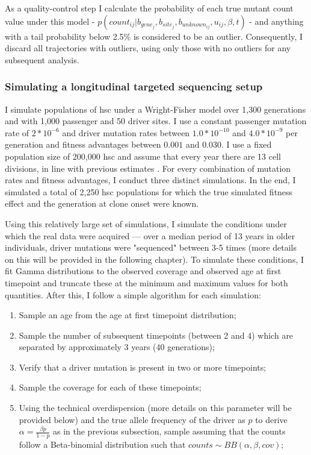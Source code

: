 As a quality-control step I calculate the probability of each true mutant count value under this model - $p(count_{ij}|b_{gene_j},b_{site_j},b_{unknown_{ij}},u_{ij},\beta,t)$ - and anything with a tail probability below 2.5\% is considered to be an outlier. Consequently, I discard all trajectories with outliers, using only those with no outliers for any subsequent analysis.

\subsubsection{Simulating a longitudinal targeted sequencing setup}

I simulate populations of \ac{hsc} under a Wright-Fisher model \cite{Beerenwinkel_undated-up} over 1,300 generations and with 1,000 passenger and 50 driver sites. I use a constant passenger mutation rate of $2*10^{-6}$ and driver mutation rates between $1.0*10^{-10}$ and $4.0*10^{-9}$ per generation and fitness advantages between $0.001$ and $0.030$. I use a fixed population size of 200,000 \ac{hsc} and assume that every year there are 13 cell divisions, in line with previous estimates \cite{Lee-Six2018-lp,Watson2020-pz}. For every combination of mutation rates and fitness advantages, I conduct three distinct simulations. In the end, I simulated a total of 2,250 \ac{hsc} populations for which the true simulated fitness effect and the generation at clone onset were known.

Using this relatively large set of simulations, I simulate the conditions under which the real data were acquired --- over a median period of 13 years in older individuals, driver mutations were "sequenced" between 3-5 times (more details on this will be provided in the following chapter). To simulate these conditions, I fit Gamma distributions to the observed coverage and observed age at first timepoint and truncate these at the minimum and maximum values for both quantities. After this, I follow a simple algorithm for each simulation:

\begin{enumerate}
    \item Sample an age from the age at first timepoint distribution;
    \item Sample the number of subsequent timepoints (between 2 and 4) which are separated by approximately 3 years (40 generations);
    \item Verify that a driver mutation is present in two or more timepoints;
    \item Sample the coverage for each of these timepoints;
    \item Using the technical overdispersion (more details on this parameter will be provided below) and the true allele frequency of the driver as $p$ to derive $\alpha = \frac{\beta p}{1-p}$ as in the previous subsection, sample assuming that the counts follow a Beta-binomial distribution such that $counts \sim BB(\alpha,\beta,cov)$;
\end{enumerate}


